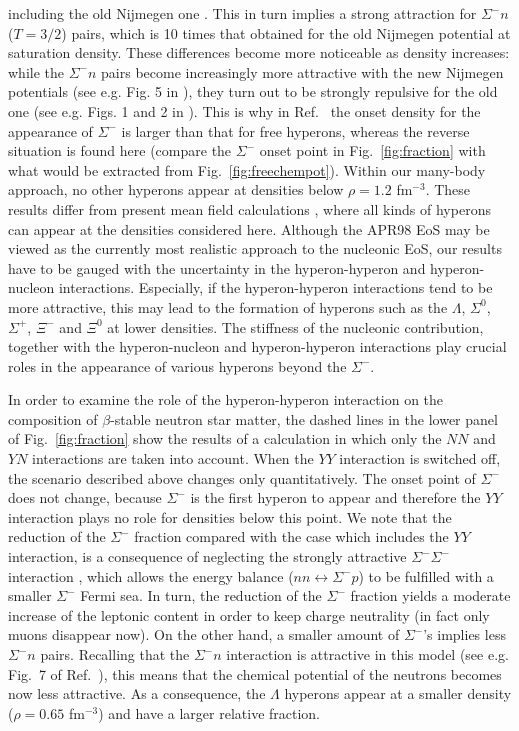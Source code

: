 including the old Nijmegen one \cite{nij89}. This 
in turn implies a strong
attraction for $\Sigma^- n$ ($T=3/2$) pairs, which is 10 times that
obtained for the old Nijmegen potential at saturation density. These differences
become more noticeable as density increases: 
while the $\Sigma^- n$ pairs become increasingly
more attractive with the new Nijmegen potentials (see e.g. Fig. 5
in \cite{isaac99}), they turn out to be strongly repulsive for the
old one (see e.g. Figs. 1 and 2 in \cite{bbs00}). This is why in Ref.\ 
\cite{bbs00} the onset density for the appearance of $\Sigma^-$ is larger
than that for free hyperons, whereas the reverse situation is found here
(compare the $\Sigma^-$ onset point in Fig.\  \ref{fig:fraction} with what
would be extracted from Fig.\ \ref{fig:freechempot}).
Within our many-body approach, no other
hyperons appear at densities below $\rho=1.2$ fm$^{-3}$. 
These results differ from present mean field calculations
\cite{prakash97,pke95,ms96}, where all kinds of hyperons can appear at
the densities considered here.
Although the APR98 EoS may be viewed as the currently
most realistic approach to the nucleonic EoS, our results have to be
gauged with the uncertainty in the hyperon-hyperon and hyperon-nucleon
interactions. Especially, if the hyperon-hyperon interactions tend to be
more attractive, this may lead to the formation of hyperons such as the
$\Lambda$, $\Sigma^0$, $\Sigma^+$, $\Xi^-$ and $\Xi^0$ at lower
densities. The stiffness of the nucleonic contribution, together with the 
hyperon-nucleon and hyperon-hyperon interactions 
play crucial roles in the appearance of various
hyperons beyond the $\Sigma^-$. 

In order to examine the role of the hyperon-hyperon interaction on the
composition of $\beta$-stable neutron star matter, the dashed lines in the
lower panel of Fig.\  \ref{fig:fraction} show the results of a calculation 
in which only the $NN$ and $YN$ interactions are taken into account. When
the $YY$ interaction is switched off, the scenario described above changes
only quantitatively. The onset point of $\Sigma^-$ does not change,
because $\Sigma^-$ is the first hyperon to appear and therefore the $YY$
interaction plays no role for densities below this point. 
We note that
the reduction of the $\Sigma^-$ fraction compared with the 
case which includes the $YY$ interaction, is a consequence of neglecting
the strongly attractive $\Sigma^-\Sigma^-$ interaction \cite{sr99}, which
allows the energy balance ($n n \leftrightarrow \Sigma^- p$) to be 
fulfilled with a smaller
$\Sigma^-$ Fermi sea.
In turn, the reduction of the $\Sigma^-$ fraction 
yields a moderate 
increase of the leptonic content in order to keep charge neutrality (in
fact only muons disappear now). On the other hand, a smaller amount of $\Sigma^-$'s
implies less
$\Sigma^-$$n$ pairs. Recalling that the $\Sigma^-$$n$
interaction is attractive in this model 
(see e.g. Fig.\ 7 of Ref.\ \cite{isaac99}),
this means that the chemical potential of the neutrons becomes now less
attractive. As a consequence, the $\Lambda$ hyperons appear at a smaller
density ($\rho=0.65$ fm$^{-3}$)
and have a larger relative fraction.      

